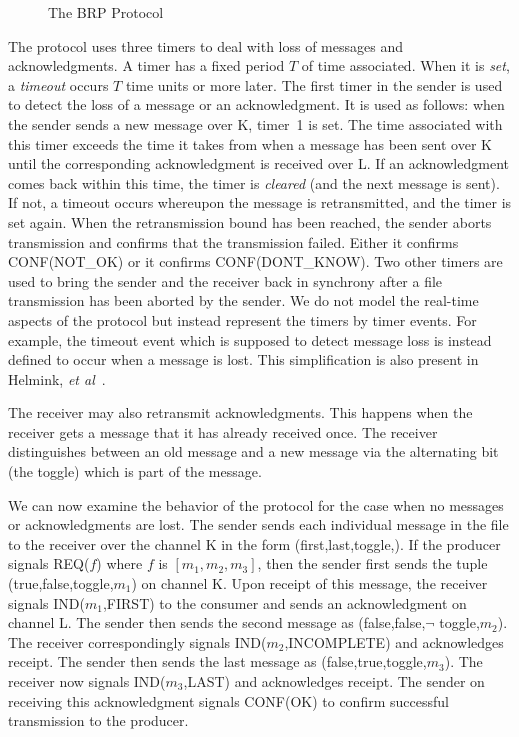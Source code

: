 \begin{figure}[htb]
\caption{The BRP Protocol}
\label{protocol-figure}
\end{figure}

The protocol uses three timers to deal with loss of messages and
acknowledgments.  A timer has a fixed period $T$ of time associated.  When
it is {\em set}, a {\em timeout} occurs $T$ time units or more later. The
first timer in the sender is used to detect the loss of a message or an
acknowledgment.  It is used as follows: when the sender sends a new
message over K, timer~1 is set.  The time associated with this
timer exceeds the time it takes from when a message has been sent over
K until the corresponding acknowledgment is received over L.
If an acknowledgment comes back within this time, the timer is {\em
cleared} (and the next message is sent).  If not, a timeout occurs
whereupon the message is retransmitted, and the timer is set again.  When
the retransmission bound has been reached, the sender aborts transmission
and confirms that the transmission failed.  Either it confirms
CONF(NOT\_OK) or it confirms CONF(DONT\_KNOW)\@.  Two other
timers are used to bring the sender and the receiver back in synchrony
after a file transmission has been aborted by the sender.  We do not model
the real-time aspects of the protocol but instead represent the timers by
timer events.  For example, the timeout event which is supposed to detect
message loss is instead defined to occur when a message is lost.  This
simplification is also present in Helmink, {\em et
al\/}~\cite{HSV:Protocol.Coq}\@.

The receiver may also retransmit  acknowledgments.  This  happens  when
the  receiver gets a 
message that it has already received once.  The receiver distinguishes
between an old message and a new  message via the alternating bit (the
toggle) which is part of the message.

We can now examine the behavior of the protocol for the case when no
messages or acknowledgments are lost.  The sender sends each individual
message  in the file to the receiver over the channel K in the form
(first,last,toggle,)\@.  If the producer signals
REQ($f$) where $f$ is $[m_1, m_2, m_3]$, 
then the sender first sends the tuple (true,false,toggle,$m_1$)
on channel K\@.  Upon receipt of this message, the receiver signals
IND($m_1$,FIRST) to the consumer and sends an acknowledgment on channel
L\@.  The sender then sends the second message as 
(false,false,$\neg$ toggle,$m_2$).  The receiver correspondingly
signals IND($m_2$,INCOMPLETE) and acknowledges receipt.
The sender then sends the last message as 
(false,true,toggle,$m_3$)\@.  The receiver now 
signals IND($m_3$,LAST) and acknowledges receipt.  The sender
on receiving this acknowledgment signals CONF(OK) to confirm
successful transmission to the producer.

